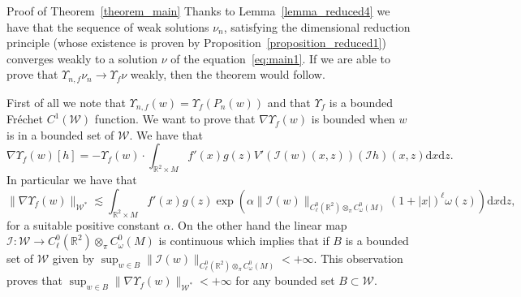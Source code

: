 \documentclass[a4paper,10pt]{article}
\newcommand{\asterisk}{\mathord{*}}
\newcommand{\mathd}{\mathrm{d}}
\newenvironment{proof*}[1]{\noindent\textbf{#1\ }}{\hspace*{\fill}$\Box$\medskip}
\begin{document}
\begin{proof*}{Proof of Theorem~\ref{theorem_main}}
  Thanks to Lemma~\ref{lemma_reduced4} we have that the sequence of weak
  solutions $\nu_n$, satisfying the dimensional reduction principle (whose
  existence is proven by Proposition~\ref{proposition_reduced1}) converges
  weakly to a solution $\nu$ of the equation~{\eqref{eq:main1}}. If we are
  able to prove that $\Upsilon_{n, f} \nu_n \rightarrow \Upsilon_f \nu$
  weakly, then the theorem would follow.
  
  First of all we note that $\Upsilon_{n, f} (w) = \Upsilon_f (P_n (w))$ and
  that $\Upsilon_f$ is a bounded Fr{\'e}chet $C^1 (\mathcal{W})$ function. We
  want to prove that $\nabla \Upsilon_f (w)$ is bounded when $w$ is in a
  bounded set of $\mathcal{W}$. We have that
  \[ \nabla \Upsilon_f (w) [h] = - \Upsilon_f (w) \cdot \int_{\mathbb{R}^2
     \times M} f' (x) g (z) V' (\mathcal{I} (w) (x, z)) (\mathcal{I} h) (x, z)
     \mathd x \mathd z. \]
  In particular we have that
  \[ \| \nabla \Upsilon_f (w) \|_{\mathcal{W}^{\asterisk}} \lesssim
     \int_{\mathbb{R}^2 \times M} f' (x) g (z) \exp (\alpha \| \mathcal{I} (w)
     \|_{C^0_{\ell} (\mathbb{R}^2) \otimes_{\pi} C^0_{\omega} (M)} (1 + | x
     |)_{}^{\ell} \omega (z)) \mathd x \mathd z, \]
  for a suitable positive constant $\alpha$. On the other hand the linear map
  $\mathcal{I} : \mathcal{W} \rightarrow C^0_{\ell} (\mathbb{R}^2)
  \otimes_{\pi} C^0_{\omega} (M)$ is continuous which implies that if $B$ is a
  bounded set of $\mathcal{W}$ given by $\sup_{w \in B} \| \mathcal{I} (w)
  \|_{C^0_{\ell} (\mathbb{R}^2) \otimes_{\pi} C^0_{\omega} (M)} < + \infty$.
  This observation proves that $\sup_{w \in B} \| \nabla \Upsilon_f (w)
  \|_{\mathcal{W}^{\asterisk}} < + \infty$ for any bounded set $B \subset
  \mathcal{W}$.
  

\end{proof*}
\end{document}
